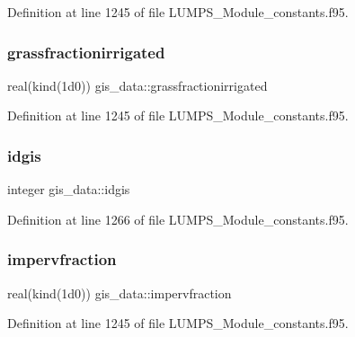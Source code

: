 Definition at line 1245 of file L\+U\+M\+P\+S\+\_\+\+Module\+\_\+constants.\+f95.

\mbox{\label{namespacegis__data_afcf40b580d0a125cd6adbb7fd65be940}} 
\subsubsection{\texorpdfstring{grassfractionirrigated}{grassfractionirrigated}}
{\footnotesize\ttfamily real(kind(1d0)) gis\+\_\+data\+::grassfractionirrigated}



Definition at line 1245 of file L\+U\+M\+P\+S\+\_\+\+Module\+\_\+constants.\+f95.

\mbox{\label{namespacegis__data_ada1260f672e04bbd0157fc95c2e36b91}} 
\subsubsection{\texorpdfstring{idgis}{idgis}}
{\footnotesize\ttfamily integer gis\+\_\+data\+::idgis}



Definition at line 1266 of file L\+U\+M\+P\+S\+\_\+\+Module\+\_\+constants.\+f95.

\mbox{\label{namespacegis__data_af2e0c2e076d483696937dc3732bd0fc2}} 
\subsubsection{\texorpdfstring{impervfraction}{impervfraction}}
{\footnotesize\ttfamily real(kind(1d0)) gis\+\_\+data\+::impervfraction}



Definition at line 1245 of file L\+U\+M\+P\+S\+\_\+\+Module\+\_\+constants.\+f95.

\mbox{\label{namespacegis__data_aeaf96e2a9b1651309ef3645d9277a439}} 
